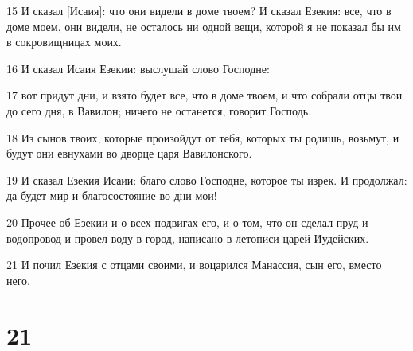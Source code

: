 \par 15 И сказал [Исаия]: что они видели в доме твоем? И сказал Езекия: все, что в доме моем, они видели, не осталось ни одной вещи, которой я не показал бы им в сокровищницах моих.
\par 16 И сказал Исаия Езекии: выслушай слово Господне:
\par 17 вот придут дни, и взято будет все, что в доме твоем, и что собрали отцы твои до сего дня, в Вавилон; ничего не останется, говорит Господь.
\par 18 Из сынов твоих, которые произойдут от тебя, которых ты родишь, возьмут, и будут они евнухами во дворце царя Вавилонского.
\par 19 И сказал Езекия Исаии: благо слово Господне, которое ты изрек. И продолжал: да будет мир и благосостояние во дни мои!
\par 20 Прочее об Езекии и о всех подвигах его, и о том, что он сделал пруд и водопровод и провел воду в город, написано в летописи царей Иудейских.
\par 21 И почил Езекия с отцами своими, и воцарился Манассия, сын его, вместо него.

\chapter{21}

